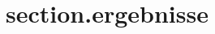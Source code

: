 %
%
\let\raggedsection\centering 
{}
\let\raggedsection\raggedright 
\glsresetall
\section{section.ergebnisse}\label{label.ergebnisse}



